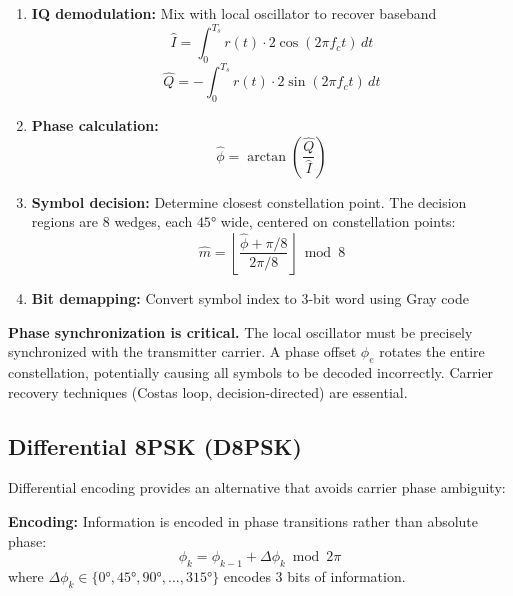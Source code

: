 \begin{enumerate}
\item \textbf{IQ demodulation:} Mix with local oscillator to recover baseband
\begin{equation}
\hat{I} = \int_0^{T_s} r(t) \cdot 2\cos(2\pi f_c t)\,dt
\end{equation}
\begin{equation}
\hat{Q} = -\int_0^{T_s} r(t) \cdot 2\sin(2\pi f_c t)\,dt
\end{equation}

\item \textbf{Phase calculation:}
\begin{equation}
\hat{\phi} = \arctan\left(\frac{\hat{Q}}{\hat{I}}\right)
\end{equation}

\item \textbf{Symbol decision:} Determine closest constellation point. The decision regions are 8 wedges, each $45°$ wide, centered on constellation points:
\begin{equation}
\hat{m} = \left\lfloor \frac{\hat{\phi} + \pi/8}{2\pi/8} \right\rfloor \bmod 8
\end{equation}

\item \textbf{Bit demapping:} Convert symbol index to 3-bit word using Gray code
\end{enumerate}

\begin{warningbox}
\textbf{Phase synchronization is critical.} The local oscillator must be precisely synchronized with the transmitter carrier. A phase offset $\phi_e$ rotates the entire constellation, potentially causing all symbols to be decoded incorrectly. Carrier recovery techniques (Costas loop, decision-directed) are essential.
\end{warningbox}

\subsection{Differential 8PSK (D8PSK)}

Differential encoding provides an alternative that avoids carrier phase ambiguity:

\textbf{Encoding:} Information is encoded in phase transitions rather than absolute phase:
\begin{equation}
\phi_k = \phi_{k-1} + \Delta\phi_k \bmod 2\pi
\end{equation}
where $\Delta\phi_k \in \{0°, 45°, 90°, \ldots, 315°\}$ encodes 3 bits of information.

